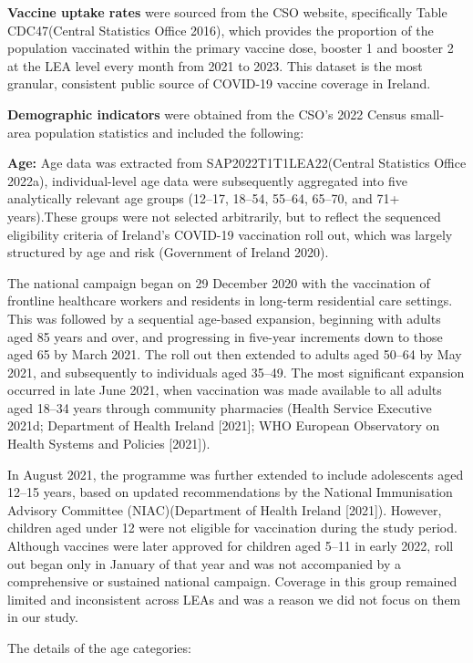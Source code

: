 \documentclass{article}
\begin{document}
\textbf{Vaccine uptake rates} were sourced from the CSO website,
specifically Table CDC47(Central Statistics Office 2016), which provides
the proportion of the population vaccinated within the primary vaccine
dose, booster 1 and booster 2 at the LEA level every month from 2021 to
2023. This dataset is the most granular, consistent public source of
COVID-19 vaccine coverage in Ireland.

\textbf{Demographic indicators} were obtained from the CSO's 2022 Census
small-area population statistics and included the following:

\textbf{Age:} Age data was extracted from SAP2022T1T1LEA22(Central
Statistics Office 2022a), individual-level age data were subsequently
aggregated into five analytically relevant age groups (12--17, 18--54,
55--64, 65--70, and 71+ years).These groups were not selected
arbitrarily, but to reflect the sequenced eligibility criteria of
Ireland's COVID-19 vaccination roll out, which was largely structured by
age and risk (Government of Ireland 2020).

The national campaign began on 29 December 2020 with the vaccination of
frontline healthcare workers and residents in long-term residential care
settings. This was followed by a sequential age-based expansion,
beginning with adults aged 85 years and over, and progressing in
five-year increments down to those aged 65 by March 2021. The roll out
then extended to adults aged 50--64 by May 2021, and subsequently to
individuals aged 35--49. The most significant expansion occurred in late
June 2021, when vaccination was made available to all adults aged 18--34
years through community pharmacies (Health Service Executive 2021d;
Department of Health Ireland {[}2021{]}; WHO European Observatory on
Health Systems and Policies {[}2021{]}).

In August 2021, the programme was further extended to include
adolescents aged 12--15 years, based on updated recommendations by the
National Immunisation Advisory Committee (NIAC)(Department of Health
Ireland {[}2021{]}). However, children aged under 12 were not eligible
for vaccination during the study period. Although vaccines were later
approved for children aged 5--11 in early 2022, roll out began only in
January of that year and was not accompanied by a comprehensive or
sustained national campaign. Coverage in this group remained limited and
inconsistent across LEAs and was a reason we did not focus on them in
our study.

The details of the age categories:
\end{document}
